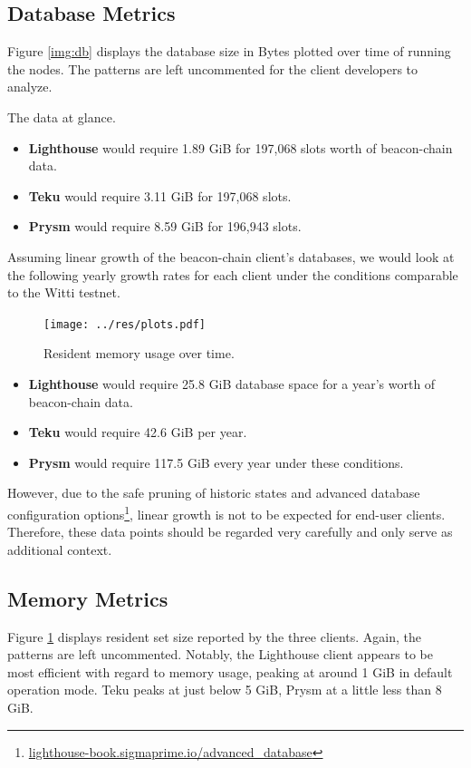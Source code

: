 \documentclass[twoside,twocolumn]{article}
\begin{document}
\subsection{Database Metrics}
Figure \ref{img:db} displays the database size in Bytes plotted over time of running the nodes. The patterns are left uncommented for the client developers to analyze.\par

The data at glance.
\begin{itemize}
\item \textbf{Lighthouse} would require 1.89 GiB for 197,068 slots worth of beacon-chain data.
\item \textbf{Teku} would require 3.11 GiB for 197,068 slots.
\item \textbf{Prysm} would require 8.59 GiB for 196,943 slots.
\end{itemize}

Assuming linear growth of the beacon-chain client's databases, we would look at the following yearly growth rates for each client under the conditions comparable to the Witti testnet.

\begin{figure}[t]
	\centering
	\texttt{[image: ../res/plots.pdf]}
	\caption{Resident memory usage over time.}
	\label{img:mem}
\end{figure}

\begin{itemize}
\item \textbf{Lighthouse} would require 25.8 GiB database space for a year's worth of beacon-chain data.
\item \textbf{Teku} would require 42.6 GiB per year.
\item \textbf{Prysm} would require 117.5 GiB every year under these conditions.
\end{itemize}

However, due to the safe pruning of historic states and advanced database configuration options\footnote{\href{https://lighthouse-book.sigmaprime.io/advanced_database.html}{lighthouse-book.sigmaprime.io/advanced\_database}}, linear growth is not to be expected for end-user clients. Therefore, these data points should be regarded very carefully and only serve as additional context.\par

\subsection{Memory Metrics}
Figure \ref{img:mem} displays resident set size reported by the three clients. Again, the patterns are left uncommented. Notably, the Lighthouse client appears to be most efficient with regard to memory usage, peaking at around 1 GiB in default operation mode. Teku peaks at just below 5 GiB, Prysm at a little less than 8 GiB.\par
\end{document}
